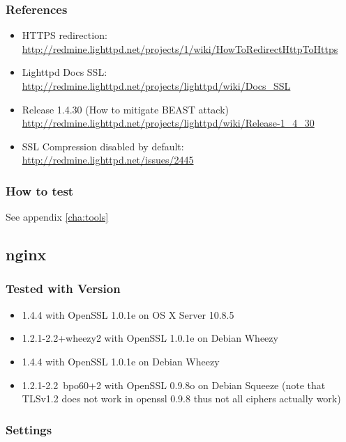 \subsubsection{References} 

\begin{itemize}
        \item HTTPS redirection: \url{http://redmine.lighttpd.net/projects/1/wiki/HowToRedirectHttpToHttps}
        \item Lighttpd Docs SSL: \url{http://redmine.lighttpd.net/projects/lighttpd/wiki/Docs\_SSL}
        \item Release 1.4.30 (How to mitigate BEAST attack) \url{http://redmine.lighttpd.net/projects/lighttpd/wiki/Release-1\_4\_30}
        \item SSL Compression disabled by default: \url{http://redmine.lighttpd.net/issues/2445}
\end{itemize}




\subsubsection{How to test} 
See appendix \ref{cha:tools}



\subsection{nginx}

\subsubsection{Tested with Version} 
\begin{itemize}
\item 1.4.4 with OpenSSL 1.0.1e on OS X Server 10.8.5
\item 1.2.1-2.2+wheezy2 with OpenSSL 1.0.1e on Debian Wheezy
\item 1.4.4 with OpenSSL 1.0.1e on Debian Wheezy
\item 1.2.1-2.2~bpo60+2 with OpenSSL 0.9.8o on Debian Squeeze (note that TLSv1.2 does not work in openssl 0.9.8 thus not all ciphers actually work)
\end{itemize}


\subsubsection{Settings}

